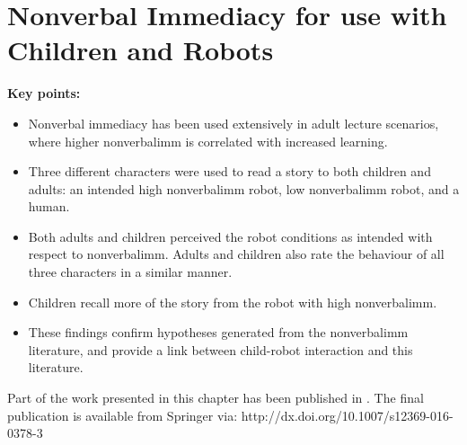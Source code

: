 \chapter{Nonverbal Immediacy for use with Children and Robots} \label{chap:validation}

\begin{framed}
	\textbf{Key points:}
	
	\begin{itemize}
	\item Nonverbal immediacy has been used extensively in adult lecture scenarios, where higher \gls{nonverbalimm} is correlated with increased learning.
	\item Three different characters were used to read a story to both children and adults: an intended high \gls{nonverbalimm} robot, low \gls{nonverbalimm} robot, and a human.
	\item Both adults and children perceived the robot conditions as intended with respect to \gls{nonverbalimm}. Adults and children also rate the behaviour of all three characters in a similar manner.
	\item Children recall more of the story from the robot with high \gls{nonverbalimm}.
	\item These findings confirm hypotheses generated from the \gls{nonverbalimm} literature, and provide a link between child-robot interaction and this literature.
	\end{itemize}
\end{framed}

Part of the work presented in this chapter has been published in \cite{kennedy2016nonverbal}. The final publication is available from Springer via: \newline http://dx.doi.org/10.1007/s12369-016-0378-3

